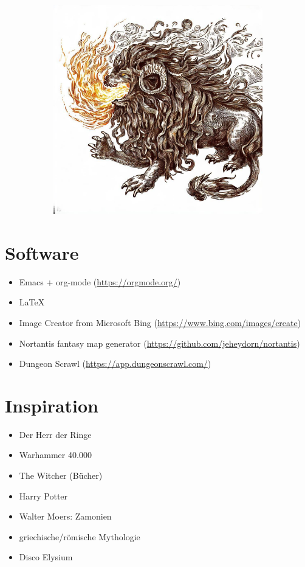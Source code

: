 \documentclass[11pt, twoside]{article}
\begin{document}
\begin{figure}[H]
\begin{subfigure}{0.3\textwidth}
  \end{subfigure}%
  \begin{subfigure}{0.3\textwidth}
    \centering
    \includegraphics[width=0.99\linewidth]{chim3.jpeg}
  \end{subfigure}
\end{figure}

\newpage
\appendix
\listoffigures
\newpage

\section{Software}
\label{sec:org36aee2e}
\begin{itemize}
\item Emacs + org-mode (\href{https://orgmode.org/}{https://orgmode.org/})
\item \LaTeX
\item Image Creator from Microsoft Bing (\href{https://www.bing.com/images/create}{https://www.bing.com/images/create})
\item Nortantis fantasy map generator (\href{https://github.com/jeheydorn/nortantis}{https://github.com/jeheydorn/nortantis})
\item Dungeon Scrawl (\href{https://app.dungeonscrawl.com/}{https://app.dungeonscrawl.com/})
\end{itemize}

\section{Inspiration}
\label{sec:org1c6b42a}
\begin{itemize}
\item Der Herr der Ringe
\item Warhammer 40.000
\item The Witcher (Bücher)
\item Harry Potter
\item Walter Moers: Zamonien
\item griechische/römische Mythologie
\item Disco Elysium
\end{itemize}
\end{document}
